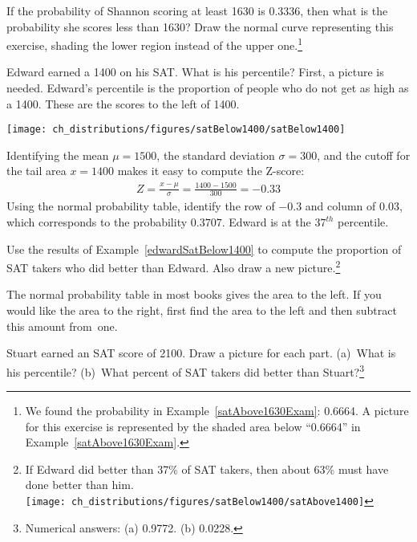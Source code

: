 \begin{exercise}
If the probability of Shannon scoring at least 1630 is 0.3336, then what is the probability she scores less than 1630? Draw the normal curve representing this exercise, shading the lower region instead of the upper one.\footnote{We found the probability in Example~\ref{satAbove1630Exam}: 0.6664. A picture for this exercise is represented by the shaded area below ``0.6664'' in Example~\ref{satAbove1630Exam}.}
\end{exercise}

\begin{example}{Edward earned a 1400 on his SAT. What is his percentile?} \label{edwardSatBelow1400}
First, a picture is needed. Edward's percentile is the proportion of people who do not get as high as a 1400. These are the scores to the left of 1400.
\begin{center}
\texttt{[image: ch\_distributions/figures/satBelow1400/satBelow1400]}
\end{center}
Identifying the mean $\mu=1500$, the standard deviation $\sigma=300$, and the cutoff for the tail area $x=1400$ makes it easy to compute the Z-score:
\begin{eqnarray*}
Z = \frac{x - \mu}{\sigma} = \frac{1400 - 1500}{300} = -0.33
\end{eqnarray*}
Using the normal probability table, identify the row of $-0.3$ and column of $0.03$, which corresponds to the probability $0.3707$. Edward is at the $37^{th}$ percentile.
\end{example}

\begin{exercise}
Use the results of Example~\ref{edwardSatBelow1400} to compute the proportion of SAT takers who did better than Edward. Also draw a new picture.\footnote{If Edward did better than 37\% of SAT takers, then about 63\% must have done better than him. \\
\texttt{[image: ch\_distributions/figures/satBelow1400/satAbove1400]}}
\end{exercise}

\begin{tipBox}{
The normal probability table in most books gives the area to the left. If you would like the area to the right, first find the area to the left and then subtract this amount from~one.}
\end{tipBox}

\begin{exercise}
Stuart earned an SAT score of 2100. Draw a picture for each part. (a)~What is his percentile? (b)~What percent of SAT takers did better than Stuart?\footnote{Numerical answers: (a) 0.9772. (b) 0.0228.}
\end{exercise}

